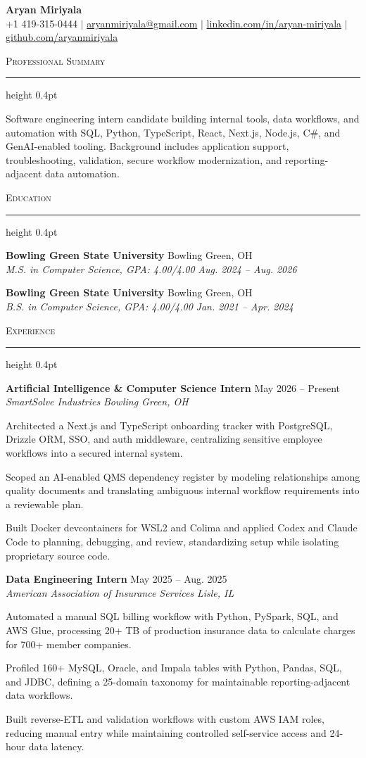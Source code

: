 \documentclass[letterpaper,11pt]{article}
\newcommand{\resumesection}[1]{%
  \par\vspace{2pt}%
  {\large\scshape #1}\par\vspace{2pt}%
  \hrule height 0.4pt\vspace{2pt}%
}
\newcommand{\resumeSubheading}[4]{
  \textbf{#1} \hfill #2\\
  \textit{#3} \hfill \textit{#4}
}
\begin{document}
\begin{center}
  {\LARGE \textbf{Aryan Miriyala}}\\[-1pt]
  \small
  +1 419-315-0444 $|$
  \href{mailto:aryanmiriyala@gmail.com}{aryanmiriyala@gmail.com} $|$
  \href{https://www.linkedin.com/in/aryan-miriyala-7788a21b6/}{linkedin.com/in/aryan-miriyala} $|$
  \href{https://github.com/aryanmiriyala}{github.com/aryanmiriyala}
\end{center}\vspace{-10pt}

\resumesection{Professional Summary}
Software engineering intern candidate building internal tools, data workflows, and automation with SQL, Python, TypeScript, React, Next.js, Node.js, C\#, and GenAI-enabled tooling. Background includes application support, troubleshooting, validation, secure workflow modernization, and reporting-adjacent data automation.

\resumesection{Education}
\resumeSubheading
{Bowling Green State University}{Bowling Green, OH}
{M.S. in Computer Science, GPA: 4.00/4.00}{Aug. 2024 -- Aug. 2026}

\resumeSubheading
{Bowling Green State University}{Bowling Green, OH}
{B.S. in Computer Science, GPA: 4.00/4.00}{Jan. 2021 -- Apr. 2024}

\resumesection{Experience}
\resumeSubheading
{Artificial Intelligence \& Computer Science Intern}{May 2026 -- Present}
{SmartSolve Industries}{Bowling Green, OH}
\begin{tightitemize}
  \item Architected a Next.js and TypeScript onboarding tracker with PostgreSQL, Drizzle ORM, SSO, and auth middleware, centralizing sensitive employee workflows into a secured internal system.
  \item Scoped an AI-enabled QMS dependency register by modeling relationships among quality documents and translating ambiguous internal workflow requirements into a reviewable plan.
  \item Built Docker devcontainers for WSL2 and Colima and applied Codex and Claude Code to planning, debugging, and review, standardizing setup while isolating proprietary source code.
\end{tightitemize}

\resumeSubheading
{Data Engineering Intern}{May 2025 -- Aug. 2025}
{American Association of Insurance Services}{Lisle, IL}
\begin{tightitemize}
  \item Automated a manual SQL billing workflow with Python, PySpark, SQL, and AWS Glue, processing 20+ TB of production insurance data to calculate charges for 700+ member companies.
  \item Profiled 160+ MySQL, Oracle, and Impala tables with Python, Pandas, SQL, and JDBC, defining a 25-domain taxonomy for maintainable reporting-adjacent data workflows.
  \item Built reverse-ETL and validation workflows with custom AWS IAM roles, reducing manual entry while maintaining controlled self-service access and 24-hour data latency.
\end{tightitemize}
\end{document}
